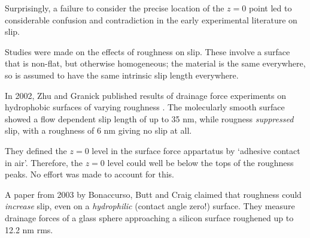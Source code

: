 \documentclass[a4paper]{report}
\begin{document}
\begin{center}
\end{center}

Surprisingly, a failure to consider the precise location of the $z=0$ point led to considerable confusion and contradiction in the early experimental literature on slip.

\vspace*{1em}

Studies were made on the effects of roughness on slip.  These involve a surface that is non-flat, but otherwise homogeneous; the material is the same everywhere, so is assumed to have the same intrinsic slip length everywhere.

\vspace*{1em}

In 2002, Zhu and Granick published results of drainage force experiments on hydrophobic surfaces of varying roughness \cite{ZhuGranick2002}.  The molecularly smooth surface showed a flow dependent slip length of up to 35 nm, while rougness \emph{suppressed} slip, with a roughness of 6 nm giving no slip at all.

They defined the $z=0$ level in the surface force appartatus by `adhesive contact in air'.  Therefore, the $z=0$ level could well be below the tops of the roughness peaks.  No effort was made to account for this.


A paper from 2003 by Bonaccurso, Butt and Craig \cite{BonaccursoButtCraig2003} claimed that roughness could \emph{increase} slip, even on a \emph{hydrophilic} (contact angle zero!) surface.
They measure drainage forces of a glass sphere approaching a silicon surface roughened up to 12.2 nm rms.
\end{document}
